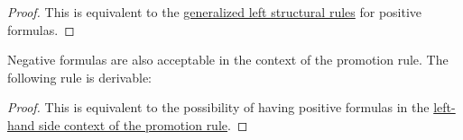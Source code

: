 \begin{proof}
This is equivalent to the \hyperref[generalized-structural-rules-pos]{generalized left structural rules} for positive formulas.
\end{proof}

Negative formulas are also acceptable in the context of the promotion
rule. The following rule is derivable:
\begin{prooftree}
\end{prooftree}

\begin{proof}
This is equivalent to the possibility of having positive formulas in the \hyperref[generalized-structural-rules-pos]{left-hand side context of the promotion rule}.
\end{proof}


